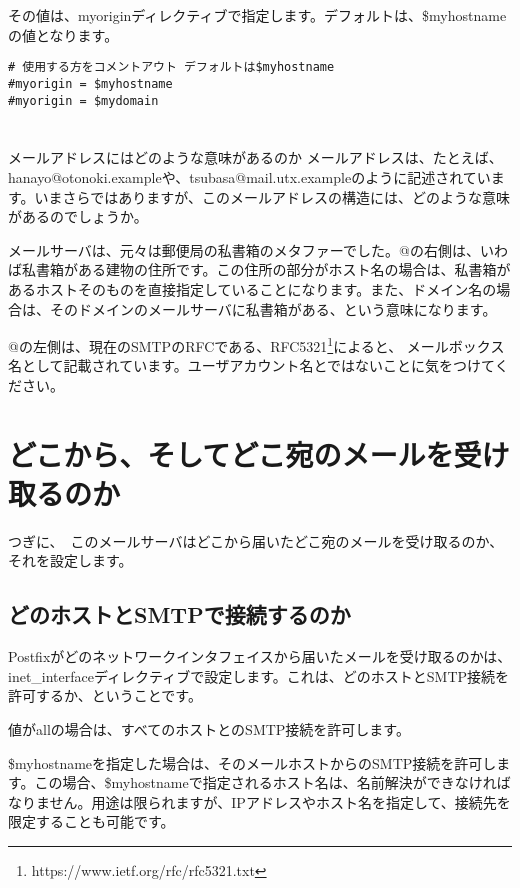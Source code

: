 その値は、myoriginディレクティブで指定します。デフォルトは、\$myhostnameの値となります。

\begin{lstlisting}[basicstyle=\ttfamily\footnotesize, frame=single]
# 使用する方をコメントアウト デフォルトは$myhostname
#myorigin = $myhostname
#myorigin = $mydomain
\end{lstlisting}

\section*{}
\begin{itembox}[l]{メールアドレスにはどのような意味があるのか}
メールアドレスは、たとえば、hanayo@otonoki.exampleや、tsubasa@mail.utx.exampleのように記述されています。いまさらではありますが、このメールアドレスの構造には、どのような意味があるのでしょうか。

メールサーバは、元々は郵便局の私書箱のメタファーでした。@の右側は、いわば私書箱がある建物の住所です。この住所の部分がホスト名の場合は、私書箱があるホストそのものを直接指定していることになります。また、ドメイン名の場合は、そのドメインのメールサーバに私書箱がある、という意味になります。

@の左側は、現在のSMTPのRFCである、RFC5321\footnote{https://www.ietf.org/rfc/rfc5321.txt}によると、
メールボックス名として記載されています。ユーザアカウント名とではないことに気をつけてください。
\end{itembox}


\section{どこから、そしてどこ宛のメールを受け取るのか}

つぎに、　このメールサーバはどこから届いたどこ宛のメールを受け取るのか、それを設定します。

\subsection{どのホストとSMTPで接続するのか}

Postfixがどのネットワークインタフェイスから届いたメールを受け取るのかは、inet\_interfaceディレクティブで設定します。これは、どのホストとSMTP接続を許可するか、ということです。

値がallの場合は、すべてのホストとのSMTP接続を許可します。

\$myhostnameを指定した場合は、そのメールホストからのSMTP接続を許可します。この場合、\$myhostnameで指定されるホスト名は、名前解決ができなければなりません。用途は限られますが、IPアドレスやホスト名を指定して、接続先を限定することも可能です。

